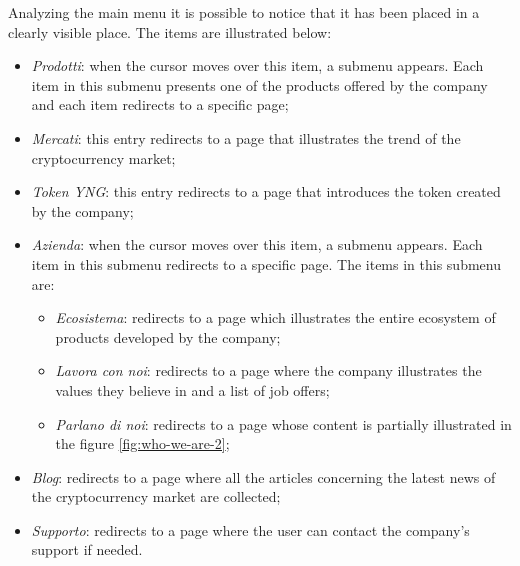 Analyzing the main menu it is possible to notice that it has been placed 
in a clearly visible place. The items are illustrated below:
\begin{itemize}
  \item \textit{Prodotti}: when the cursor moves over this item, a submenu 
  appears. Each item in this submenu presents one of the products offered 
  by the company and each item redirects to a specific page;

  \item \textit{Mercati}: this entry redirects to a page that illustrates 
  the trend of the cryptocurrency market;
  
  \item \textit{Token YNG}: this entry redirects to a page that introduces 
  the token created by the company;

  \item \textit{Azienda}: when the cursor moves over this item, a submenu 
  appears. Each item in this submenu redirects to a specific page. The 
  items in this submenu are:
  \begin{itemize}
    \item \textit{Ecosistema}: redirects to a page which illustrates the 
    entire ecosystem of products developed by the company;

    \item \textit{Lavora con noi}: redirects to a page where the company 
    illustrates the values they believe in and a list of job offers;

    \item \textit{Parlano di noi}: redirects to a page whose content is 
    partially illustrated in the figure \ref{fig:who-we-are-2};
  \end{itemize}

  \item \textit{Blog}: redirects to a page where all the articles 
  concerning the latest news of the cryptocurrency market are collected;

  \item \textit{Supporto}: redirects to a page where the user can contact 
  the company's support if needed.
\end{itemize}

